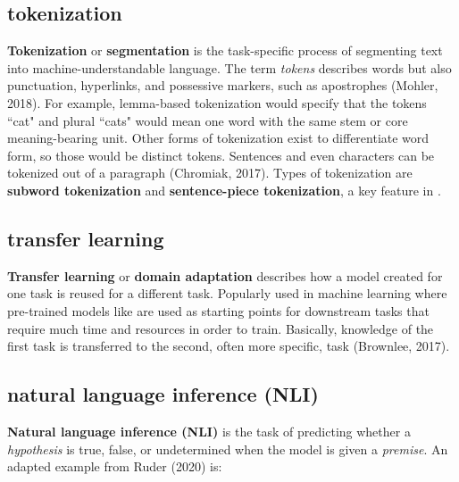 \subsection{tokenization} \label{nlptask:tokenization}

\textbf{Tokenization} or \textbf{segmentation} is the task-specific process of segmenting text into machine-understandable language. The term \emph{tokens} describes words but also punctuation, hyperlinks, and possessive markers, such as apostrophes (Mohler, 2018). For example, lemma-based tokenization would specify that the tokens ``cat" and plural ``cats" would mean one word with the same stem or core meaning-bearing unit. Other forms of tokenization exist to differentiate word form, so those would be distinct tokens. Sentences and even characters can be tokenized out of a paragraph (Chromiak, 2017). Types of tokenization are \textbf{subword tokenization} and \textbf{sentence-piece tokenization}, a key feature in . 


\subsection{transfer learning} \label{nlptask:transferlearning}

\textbf{Transfer learning} or \textbf{domain adaptation} describes how a model created for one task is reused for a different task. Popularly used in machine learning where pre-trained models like  are used as starting points for downstream tasks that require much time and resources in order to train. Basically, knowledge of the first task is transferred to the second, often more specific, task (Brownlee, 2017).


\subsection{natural language inference (NLI)} \label{nlptask:naturallanguageinferenceNLI}

\textbf{Natural language inference (NLI)} is the task of predicting whether a \emph{hypothesis} is true, false, or undetermined when the model is given a \emph{premise}. An adapted example from  Ruder (2020) is: 



\begingroup

\setlength{\tabcolsep}{8pt} %
\renewcommand{\arraystretch}{2} %

